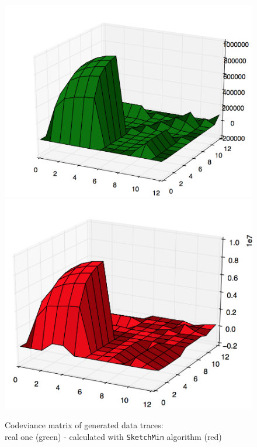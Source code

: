 \documentclass[a4paper]{article}%
\begin{document}
\begin{figure}[H]
	\centering
	\includegraphics[scale=0.23]{generated_real.png}
	\includegraphics[scale=0.23]{generated_sk.png}
	\caption{\footnotesize Codeviance matrix of generated data traces:\\real one (green) - calculated with \texttt{SketchMin} algorithm (red)}
	\label{ref:exp_artificial}
\end{figure}
\end{document}
